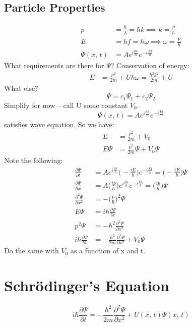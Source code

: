 \documentclass[a4paper, 11pt, normalem]{report}
\begin{document}
\subsection{Particle Properties}
\begin{align}
    p &= \frac{h}{\lambda} = \hbar k \implies k = \frac{p}{\hbar} \\
    E &= hf = \hbar\omega \implies \omega = \frac{E}{\hbar} \\
    \Psi(x,\,t) &= Ae^{i\tfrac{px}{\hbar}}e^{-i\tfrac{Et}{\hbar}}
\end{align}
What requirements are there for $\Psi$?
Conservation of energy:
\begin{align}
    E &= \frac{p^{2}}{2m} + U \hbar\omega = \frac{\hbar^{2}k^{2}}{2m} + U
\end{align}
What else?
\begin{equation}
    \Psi = c_{1}\Psi_{1} + c_{2}\Psi_{2}
\end{equation}
Simplify for now -- call U some constant $V_{0}$.
\begin{equation}
    \Psi(x,\,t) = Ae^{i\tfrac{px}{\hbar}}e^{-i\tfrac{Et}{\hbar}}
\end{equation}
satisfies wave equation.
So we have:
\begin{align}
    E &= \frac{p^{2}}{2m} + V_{0} \\
    E\Psi &= \frac{p^{2}}{2m}\Psi + V_{0}\Psi
\end{align}
Note the following:
\begin{align}
    \frac{\partial \Psi}{\partial t} &= Ae^{i\tfrac{px}{\hbar}}\Big(-\frac{iE}{\hbar}\Big)e^{-i\tfrac{Et}{\hbar}} = \Big(-\frac{iE}{\hbar}\Big)\Psi \\
    \frac{\partial \Psi}{\partial x} &= A\Big(\frac{ip}{\hbar}\Big)e^{i\tfrac{px}{\hbar}}e^{-i\tfrac{Et}{\hbar}} = \Big(\frac{ip}{\hbar}\Big)\Psi \\
    \frac{\partial^{2} \Psi}{\partial x^{2}} &= -\Big(\frac{p}{\hbar}\Big)^{2}\Psi \\
    E\Psi &= i\hbar\frac{\partial \Psi}{\partial t} \\
    p^{2}\Psi &= -\hbar^{2}\frac{\partial^{2} \Psi}{\partial x^{2}} \\
    i\hbar\frac{\partial \Psi}{\partial t} &= -\frac{\hbar^{2}}{2m}\frac{\partial^{2} \Psi}{\partial x^{2}} + V_{0}\Psi
\end{align}
Do the same with $V_{0}$ as a function of x and t.

\section{Schr\"{o}dinger's Equation}
\begin{equation}
    i\hbar\frac{\partial \Psi}{\partial t} = -\frac{\hbar^{2}}{2m}\frac{\partial^{2} \Psi}{\partial x^{2}} + U(x,\,t)\Psi(x,\,t)
\end{equation}
\end{document}
